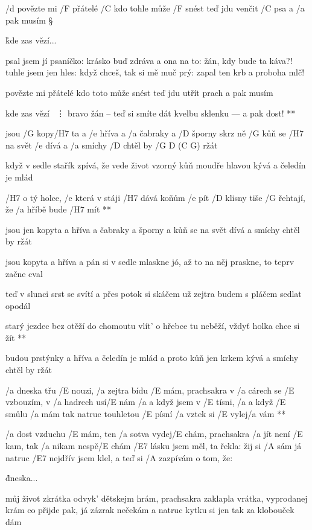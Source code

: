 /d povězte mi /F přátelé /C kdo tohle může /F snést
teď jdu venčit /C psa a /a pak musím \S

\r  kde zas vězí...

psal jsem jí psaníčko: krásko buď zdráva
a ona na to: žán, kdy bude ta káva?!
tuhle jsem jen hles: když chceš, tak si mě muč
prý: zapal ten krb a proboha mlč!

povězte mi přátelé kdo toto může snést
teď jdu utřít prach a pak musím

\R  kde zas vězí
    \ \vdots
    bravo žán -- teď si smíte dát kvelbu sklenku --- a pak dost! **





jsou /G kopy/H7 ta a /e hříva a /a čabraky a /D šporny
skrz ně /G kůň se /H7 na svět /e dívá a /a smíchy /D chtěl by /{G D (C G)} ržát \s

když v sedle stařík zpívá, že vede život vzorný
kůň moudře hlavou kývá a čeledín je mlád

\R  /H7 o tý holce, /e která v stáji /H7 dává koňům /e pít
    /D klisny tiše /G řehtají, že /a hříbě bude /H7 mít **

jsou jen kopyta a hříva a čabraky a šporny
a kůň se na svět dívá a smíchy chtěl by ržát \s

jsou kopyta a hříva a pán si v sedle mlaskne
jó, až to na něj praskne, to teprv začne cval \s

teď v slunci srst se svítí a přes potok si skáčem
už zejtra budem s pláčem sedlat opodál

\R  starý jezdec bez otěží do chomoutu vlít'
    o hřebce tu neběží, vždyť holka chce si žít **

budou prstýnky a hříva a čeledín je mlád
a proto kůň jen krkem kývá a smíchy chtěl by ržát 




\R  /a dneska třu /E nouzi, /a zejtra bídu /E mám, prachsakra
    v /a cárech se /E vzbouzím, v /a hadrech usí/E nám
    /a a když jsem v /E tísni, /a a když /E smůlu /a mám
    tak natruc touhletou /E písní /a vztek si /E vylej/a vám **

/a dost vzduchu /E mám, ten /a sotva vydej/E chám, prachsakra
/a jít není /E kam, tak /a nikam nespě/E chám
/E7 lásku jsem měl, ta řekla: žij si /A sám
já natruc /E7 nejdřív jsem klel, a teď si /A zazpívám o tom, že:

\r dneska...

můj život zkrátka odvyk' dětskejm hrám, prachsakra
zaklapla vrátka, vyprodanej krám
co přijde pak, já zázrak nečekám
a natruc kytku si jen tak za klobouček dám

